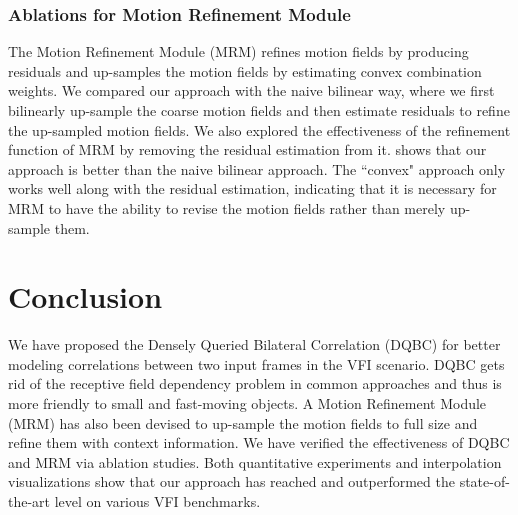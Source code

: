 \documentclass{article}
\begin{document}
\subsubsection{Ablations for Motion Refinement Module}

The Motion Refinement Module (MRM) refines motion fields by producing residuals and up-samples the motion fields by estimating convex combination weights. We compared our approach with the naive bilinear way, where we first bilinearly up-sample the coarse motion fields and then estimate residuals to refine the up-sampled motion fields. We also explored the effectiveness of the refinement function of MRM by removing the residual estimation from it.  shows that our approach is better than the naive bilinear approach. The ``convex" approach only works well along with the residual estimation, indicating that it is necessary for MRM to have the ability to revise the motion fields rather than merely up-sample them.





\section{Conclusion}

We have proposed the Densely Queried Bilateral Correlation (DQBC) for better modeling correlations between two input frames in the VFI scenario. DQBC gets rid of the receptive field dependency problem in common approaches and thus is more friendly to small and fast-moving objects. A Motion Refinement Module (MRM) has also been devised to up-sample the motion fields to full size and refine them with context information. We have verified the effectiveness of DQBC and MRM via ablation studies. Both quantitative experiments and interpolation visualizations show that our approach has reached and outperformed the state-of-the-art level on various VFI benchmarks.








\end{document}

